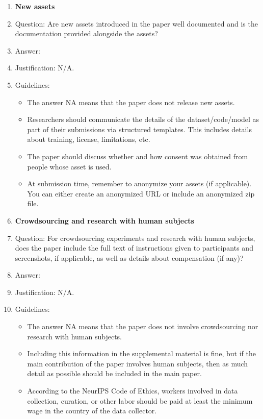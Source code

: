 \documentclass{article}
\begin{document}
\begin{enumerate}
\item {\bf New assets}
    \item[] Question: Are new assets introduced in the paper well documented and is the documentation provided alongside the assets?
    \item[] Answer: \answerNA{} %
    \item[] Justification: N/A.
    \item[] Guidelines:
    \begin{itemize}
        \item The answer NA means that the paper does not release new assets.
        \item Researchers should communicate the details of the dataset/code/model as part of their submissions via structured templates. This includes details about training, license, limitations, etc. 
        \item The paper should discuss whether and how consent was obtained from people whose asset is used.
        \item At submission time, remember to anonymize your assets (if applicable). You can either create an anonymized URL or include an anonymized zip file.
    \end{itemize}

\item {\bf Crowdsourcing and research with human subjects}
    \item[] Question: For crowdsourcing experiments and research with human subjects, does the paper include the full text of instructions given to participants and screenshots, if applicable, as well as details about compensation (if any)? 
    \item[] Answer: \answerNA{} %
    \item[] Justification: N/A.
    \item[] Guidelines:
    \begin{itemize}
        \item The answer NA means that the paper does not involve crowdsourcing nor research with human subjects.
        \item Including this information in the supplemental material is fine, but if the main contribution of the paper involves human subjects, then as much detail as possible should be included in the main paper. 
        \item According to the NeurIPS Code of Ethics, workers involved in data collection, curation, or other labor should be paid at least the minimum wage in the country of the data collector. 
    \end{itemize}


\end{enumerate}
\end{document}
